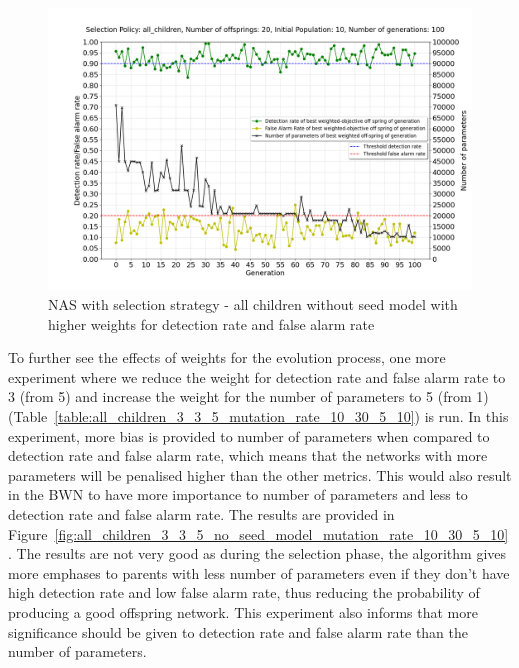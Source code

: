 \begin{figure}[h!]
    \centering
        \includegraphics[width=1.0\linewidth, height=7.5cm]{BachelorMasterThesis/ExperimentsAndResults/Figures/all_children/all_children_5_5_1_no_seed_model_mutation_rate_10_30_5_10.png}
        \caption{NAS with selection strategy - all children without seed model with higher weights for detection rate and false alarm rate}
        \label{fig:all_children_5_5_1_no_seed_model_mutation_rate_10_30_5_10}
\end{figure}

To further see the effects of weights for the evolution process, one more experiment where we reduce the weight for detection rate and false alarm rate to 3 (from 5) and increase the weight for the number of parameters to 5 (from 1) (Table~\ref{table:all_children_3_3_5_mutation_rate_10_30_5_10}) is run. In this experiment, more bias is provided to number of parameters when compared to detection rate and false alarm rate, which means that the networks with more parameters will be penalised higher than the other metrics. This would also result in the BWN to have more importance to number of parameters and less to detection rate and false alarm rate. The results are provided in Figure~\ref{fig:all_children_3_3_5_no_seed_model_mutation_rate_10_30_5_10}. The results are not very good as during the selection phase, the algorithm gives more emphases to parents with less number of parameters even if they don't have high detection rate and low false alarm rate, thus reducing the probability of producing a good offspring network. This experiment also informs that more significance should be given to detection rate and false alarm rate than the number of parameters. 

